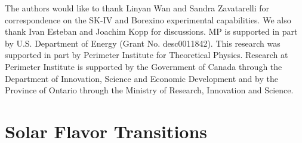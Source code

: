 \documentclass[
reprint,
superscriptaddress,
showpacs,
preprintnumbers,
nofootinbib,
nobibnotes,
amsmath,
amssymb, 
aps,
prd,
floatfix
]{revtex4-1}
\begin{document}
\begin{acknowledgments}
The authors would like to thank Linyan Wan and Sandra Zavatarelli for correspondence on the SK-IV and Borexino experimental capabilities. We also thank Ivan Esteban and Joachim Kopp for discussions. MP is supported in part by U.S. Department of Energy (Grant No. desc0011842). This research was supported in part by Perimeter Institute for Theoretical Physics. Research at Perimeter Institute is supported by the Government of Canada through the Department of Innovation, Science and Economic Development and by the Province of Ontario through the Ministry of Research, Innovation and Science.
\end{acknowledgments}



\appendix

\section{Solar Flavor Transitions}\label{app:Pse}
\end{document}
